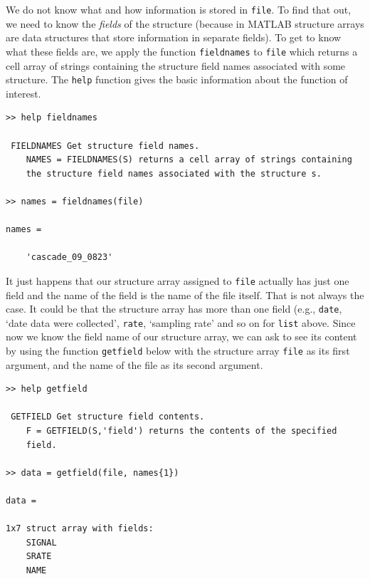 \documentclass[a4paper, 12pt]{article}
\begin{document}
We do not know what and how information is stored in \texttt{file}. To find that out, we need to know the \textit{fields} of the structure (because in MATLAB structure arrays are data structures that store information in separate fields). To get to know what these fields are, we apply the function \texttt{fieldnames} to \texttt{file} which returns a cell array of strings containing the structure field names associated with some structure. The \texttt{help} function gives the basic information about the function of interest.

\begin{verbatim}
>> help fieldnames

 FIELDNAMES Get structure field names.
    NAMES = FIELDNAMES(S) returns a cell array of strings containing 
    the structure field names associated with the structure s.

>> names = fieldnames(file)

names = 

    'cascade_09_0823'
\end{verbatim}

It just happens that our structure array assigned to \texttt{file} actually has just one field and the name of the field is the name of the file itself. That is not always the case. It could be that the structure array has more than one field (e.g., \texttt{date}, `date data were collected', \texttt{rate}, `sampling rate' and so on for \texttt{list} above. Since now we know the field name of our structure array, we can ask to see its content by using the function \texttt{getfield} below with the structure array \texttt{file} as its first argument, and the name of the file as its second argument.

\begin{verbatim}
>> help getfield

 GETFIELD Get structure field contents.
    F = GETFIELD(S,'field') returns the contents of the specified
    field.

>> data = getfield(file, names{1})

data = 

1x7 struct array with fields:
    SIGNAL
    SRATE
    NAME
\end{verbatim}
\end{document}
